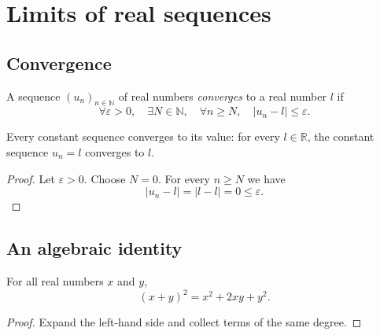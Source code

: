 
\chapter{Limits of real sequences}

\section{Convergence}

\begin{definition}\label{def:converges}
  A sequence $(u_n)_{n \in \mathbb{N}}$ of real numbers \emph{converges} to a real
  number $l$ if
  \[
    \forall \varepsilon > 0,\quad \exists N \in \mathbb{N},\quad
    \forall n \ge N,\quad \lvert u_n - l \rvert \le \varepsilon .
  \]
  \leanok
\end{definition}

\begin{theorem}\label{thm:const}
  Every constant sequence converges to its value: for every $l \in \mathbb{R}$,
  the constant sequence $u_n = l$ converges to $l$.
\end{theorem}

\begin{proof}\leanok
  Let $\varepsilon > 0$. Choose $N = 0$. For every $n \ge N$ we have
  \[
    \lvert u_n - l \rvert = \lvert l - l \rvert = 0 \le \varepsilon .
  \]
\end{proof}

\section{An algebraic identity}

\begin{theorem}\label{thm:binomial}
  For all real numbers $x$ and $y$,
  \[
    (x + y)^2 = x^2 + 2xy + y^2 .
  \]
\end{theorem}

\begin{proof}\leanok
  Expand the left-hand side and collect terms of the same degree.
\end{proof}
